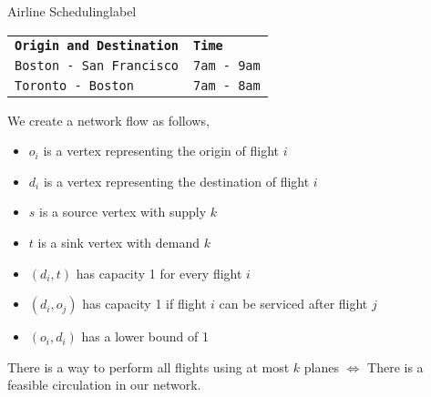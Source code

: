  	 	\begin{ex}{Airline Scheduling}{label}
 	 	\begin{tabular}{ll}
			\textbf{\texttt{Origin and Destination}} & \textbf{\texttt{Time}} \\
			\texttt{Boston - San Francisco} & \texttt{7am - 9am} \\
			\texttt{Toronto - Boston} & \texttt{7am - 8am}
		\end{tabular}

		\vphantom{.}

 		We create a network flow as follows,
 		\begin{itemize}
 			\item $o_i$ is a vertex representing the origin of flight $i$
 			\item $d_i$ is a vertex representing the destination of flight $i$
 			\item $s$ is a source vertex with supply $k$
 			\item $t$ is a sink vertex with demand $k$
 			\item $(d_i, t)$ has capacity 1 for every flight $i$
 			\item $(d_i, o_j)$ has capacity 1 if flight $i$ can be serviced after flight $j$
 			\item $(o_i, d_i)$ has a lower bound of 1
 		\end{itemize}
 		There is a way to perform all flights using at most $k$ planes $\iff$ There is a feasible circulation in our network.
	\end{ex}

